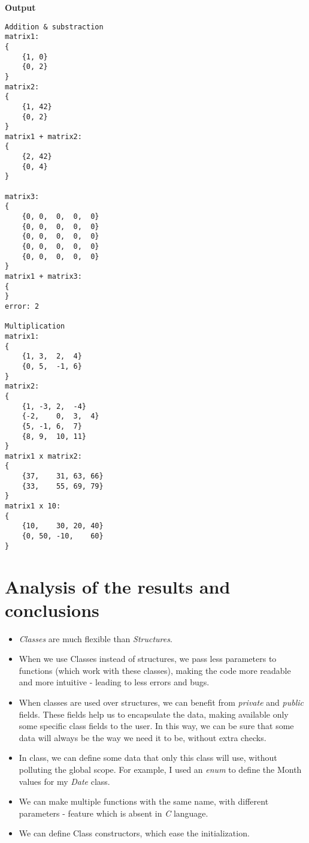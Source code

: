 \documentclass{article}
\begin{document}
			\begin{minipage}{\textwidth}
				\begin{center}
					\textbf{Output}
				\end{center}

				\begin{lstlisting}
Addition & substraction
matrix1:
{
	{1,	0}
	{0,	2}
}
matrix2:
{
	{1,	42}
	{0,	2}
}
matrix1 + matrix2:
{
	{2,	42}
	{0,	4}
}

matrix3:
{
	{0,	0,	0,	0,	0}
	{0,	0,	0,	0,	0}
	{0,	0,	0,	0,	0}
	{0,	0,	0,	0,	0}
	{0,	0,	0,	0,	0}
}
matrix1 + matrix3:
{
}
error: 2

Multiplication
matrix1:
{
	{1,	3,	2,	4}
	{0,	5,	-1,	6}
}
matrix2:
{
	{1,	-3,	2,	-4}
	{-2,	0,	3,	4}
	{5,	-1,	6,	7}
	{8,	9,	10,	11}
}
matrix1 x matrix2:
{
	{37,	31,	63,	66}
	{33,	55,	69,	79}
}
matrix1 x 10:
{
	{10,	30,	20,	40}
	{0,	50,	-10,	60}
}
				\end{lstlisting}
			\end{minipage}
			\pagebreak

	\section{Analysis of the results and conclusions}
		\begin{itemize}
			\item \textit{Classes} are much flexible than \textit{Structures}.

			\item When we use Classes instead of structures, we pass less parameters to functions (which work with these classes), making the code more readable and more intuitive - leading to less errors and bugs.

			\item When classes are used over structures, we can benefit from \textit{private} and \textit{public} fields. These fields help us to encapsulate the data, making available only some specific class fields to the user. In this way, we can be sure that some data will always be the way we need it to be, without extra checks.

			\item In class, we can define some data that only this class will use, without polluting the global scope. For example, I used an \textit{enum} to define the Month values for my \textit{Date} class.

			\item We can make multiple functions with the same name, with different parameters - feature which is absent in \textit{C} language.

			\item We can define Class constructors, which ease the initialization.
		\end{itemize}
\end{document}
